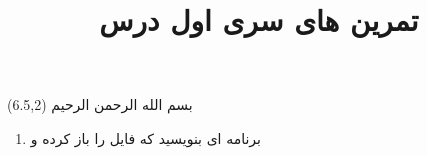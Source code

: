 \documentclass[oneside]{article}
\title{تمرین های سری اول درس
\lr{Service Based Architecture}
}
\date{\vspace{-5ex}}
\begin{document}
\maketitle

\begin{textblock}{5}(6.5,2)\nastaliqfont
\noindent\Large
بسم الله الرحمن الرحیم
\end{textblock}

\begin{enumerate}
\item
برنامه ای بنویسید که فایل 
را باز کرده و 
\end{enumerate}

\end{document}
